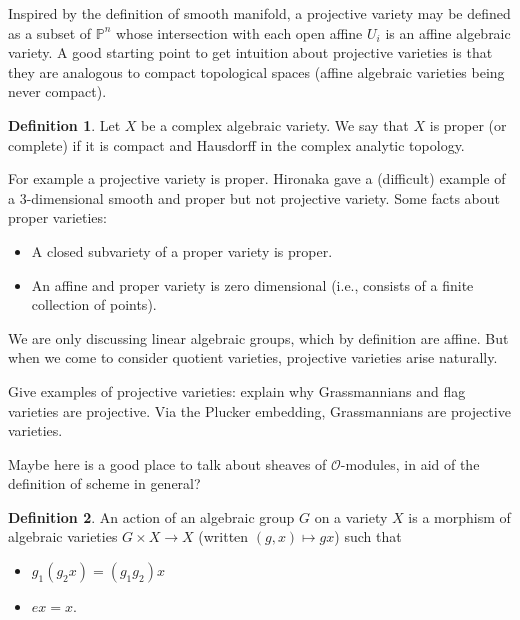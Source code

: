 \documentclass[12pt]{article}
\theoremstyle{plain}
\theoremstyle{definition}
\newtheorem{defn}{Definition}[section]
\numberwithin{equation}{section}
\newcommand{\bbP}{\mathbb{P}}
\newcommand{\OO}{\mathcal{O}}
\begin{document}
Inspired by the definition of smooth manifold, a projective variety may be defined as a subset of $\bbP^n$ whose intersection with each open affine $U_i$ is an affine algebraic variety. A good starting point to get intuition about projective varieties is that they are analogous to compact topological spaces (affine algebraic varieties being never compact).
\begin{defn}
Let $X$ be a complex algebraic variety. We say that $X$ is proper (or complete) if it is compact and Hausdorff in the complex analytic topology.
\end{defn}
For example a projective variety is proper. Hironaka gave a (difficult) example of a $3$-dimensional smooth and proper but not projective variety. Some facts about proper varieties:
\begin{itemize}
\item A closed subvariety of a proper variety is proper.

\item An affine and proper variety is zero dimensional (i.e., consists of a finite collection of points).
\end{itemize}

We are only discussing linear algebraic groups, which by definition are affine. But when we come to consider quotient varieties, projective varieties arise naturally.




{\color{red}

Give examples of projective varieties: explain why Grassmannians and flag varieties are projective. Via the Plucker embedding, Grassmannians are projective varieties.

Maybe here is a good place to talk about sheaves of $\OO$-modules, in aid of the definition of scheme in general?}






\begin{defn}
An action of an algebraic group $G$ on a variety $X$ is a morphism of algebraic varieties $G \times X \rightarrow X$ (written $(g, x) \mapsto gx$) such that
\begin{itemize}
 \item $g_1(g_2 x) = (g_1g_2) x$


\item $ex = x$.
\end{itemize}
\end{defn}
\end{document}
